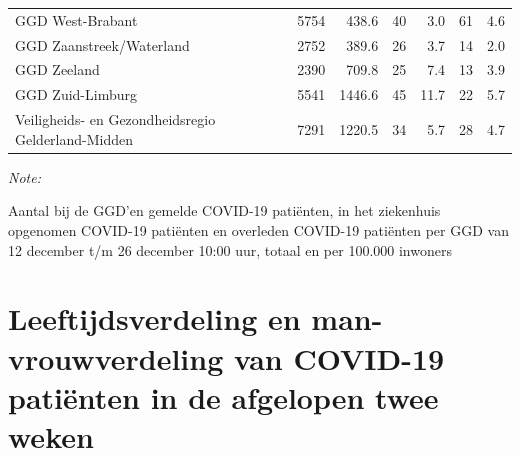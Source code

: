 \documentclass[
  english,
  man,floatsintext]{apa6}
\begin{document}
\begin{table}[H]
\begin{threeparttable}
\begin{tabular}{lrrrrrr}
GGD West-Brabant & 5754 & 438.6 & 40 & 3.0 & 61 & 4.6\\
GGD Zaanstreek/Waterland & 2752 & 389.6 & 26 & 3.7 & 14 & 2.0\\
GGD Zeeland & 2390 & 709.8 & 25 & 7.4 & 13 & 3.9\\
GGD Zuid-Limburg & 5541 & 1446.6 & 45 & 11.7 & 22 & 5.7\\
Veiligheids- en Gezondheidsregio Gelderland-Midden & 7291 & 1220.5 & 34 & 5.7 & 28 & 4.7\\
\bottomrule
\end{tabular}
\begin{tablenotes}
\item \textit{Note: } 
\item Aantal bij de GGD’en gemelde COVID-19 patiënten, in het ziekenhuis opgenomen COVID-19 patiënten en overleden COVID-19 patiënten per GGD van 12 december t/m 26 december 10:00 uur, totaal en per 100.000 inwoners
\end{tablenotes}
\end{threeparttable}
\endgroup{}
\end{table}

\newpage

\hypertarget{leeftijdsverdeling-en-man-vrouwverdeling-van-covid-19-patiuxebnten-in-de-afgelopen-twee-weken}{%
\section{Leeftijdsverdeling en man-vrouwverdeling van COVID-19 patiënten in de afgelopen twee weken}\label{leeftijdsverdeling-en-man-vrouwverdeling-van-covid-19-patiuxebnten-in-de-afgelopen-twee-weken}}
\end{document}
